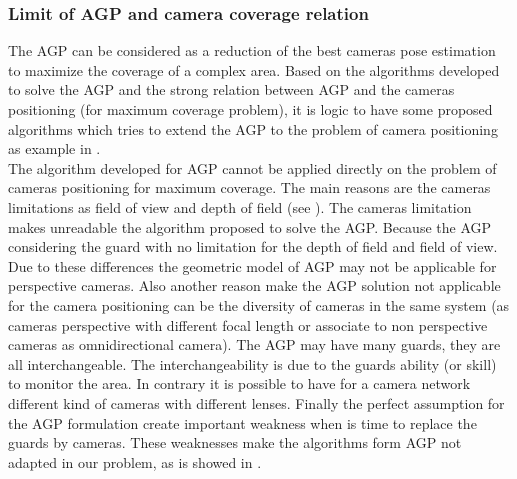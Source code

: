 
	
	\subsubsection{Limit of AGP and camera coverage relation}

The AGP can be considered as a reduction of the best cameras pose estimation to maximize the coverage of a complex area. Based on the algorithms developed to solve the AGP and the strong relation between AGP and the cameras positioning (for maximum coverage problem), it is logic to have some proposed algorithms which tries to extend the AGP to the  problem of camera positioning as example in \cite{221*fleishman2000,33*reddy2012,43*erdem2006}.\\
The algorithm developed for AGP cannot be applied directly on the problem of cameras positioning for maximum coverage. The main reasons are the cameras limitations as field of view and depth of field (see \cite{82*chrysostomou2012,170*yabuta2008}). The cameras limitation makes  unreadable the algorithm proposed to solve the AGP.
 Because the AGP considering the guard with no limitation for the depth of field and field of view. Due to these differences the geometric model of AGP may not be applicable for perspective cameras.
Also another reason make the AGP solution not applicable for the camera positioning can be the diversity of cameras in the same system (as cameras perspective with different focal length or associate to non perspective cameras as omnidirectional camera).
 The AGP may have many guards, they are all interchangeable. The interchangeability is due to the guards ability (or skill) to monitor the area. In contrary it is possible to have for a camera network different kind of cameras with different lenses. 
Finally the  perfect assumption for the AGP formulation create important weakness when is time to replace the guards by cameras. These weaknesses make the algorithms form AGP not adapted in our problem, as is showed in \cite{81*nikolaidis2009,171*horster2006}.

